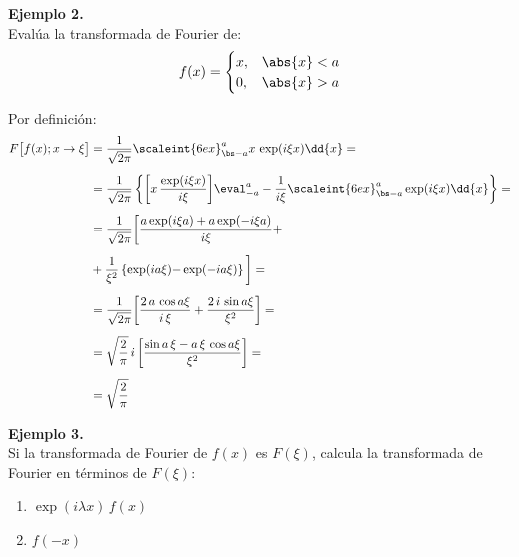 \noindent
\textbf{Ejemplo 2.}
\\
Evalúa la transformada de Fourier de:
\begin{align*}
f(x) = \begin{cases}
x, & \abs{x} < a \\
0, & \abs{x} > a
\end{cases}
\end{align*}

Por definición:
\begin{align*}
F \big[ f(x); x \to \xi \big] &= \dfrac{1}{\sqrt{2 \pi}} \scaleint{6ex}_{\bs -a}^{a} x \, \exp(i \xi x) \dd{x} = \\[0.5em]
&= \dfrac{1}{\sqrt{2 \pi}} \left\{ \bigg[ x \, \dfrac{\exp(i \xi x)}{i \xi} \bigg] \eval_{-a}^{a} - \dfrac{1}{i \xi} \scaleint{6ex}_{\bs -a}^{a} \exp(i \xi x) \dd{x} \right\} = \\[0,5em]
&= \dfrac{1}{\sqrt{2 \pi}} \bigg[ \dfrac{a \exp(i \xi a) + a \exp(-i \xi a)}{i \xi} {+} \\[0.5em]
&+ \dfrac{1}{\xi^{2}} \left\{ \exp(i a \xi) {-} \exp(-i a \xi) \right\} \bigg] = \\[0.5em]
&= \dfrac{1}{\sqrt{2 \pi}} \bigg[ \dfrac{2 \, a \, \cos a \xi}{i \, \xi} + \dfrac{2 \, i \, \sin a \xi}{\xi^{2}} \bigg] = \\[0.5em]
&= \sqrt{\dfrac{2}{\pi}} \, i \, \bigg[ \dfrac{\sin a \, \xi - a \, \xi \, \cos a \xi}{\xi^{2}} \bigg] = \\[0.5em]
&= \sqrt{\dfrac{2}{\pi}}
\end{align*}

\noindent
\textbf{Ejemplo 3.}
\\
Si la transformada de Fourier de $f(x)$ es $F(\xi)$, calcula la transformada de Fourier en términos de $F(\xi)$:
\begin{enumerate}[label=\roman*)]
\item $\exp(i \lambda x) \, f(x)$
\item $f(-x)$
\end{enumerate}

